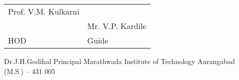 \documentclass[12pt]{article}
\begin{document}
	

		\begin{table}[h]
			\centering
			\begin{tabular}{ |p{6cm}|p{6cm}| }
				\hline
				 \centering
				  Prof. V.M. Kulkarni \\  &    Mr. V.P. Kardile \\
				   \centering
				    HOD  &   Guide \\ \hline
			\end{tabular}					
		\end{table}
		

		 	
		 				
		  \centering
			  Dr.J.H.Godihal
		  Principal
		  Marathwada Institute of Technology 
		  Aurangabad (M.S.) – 431 005

	
	  
	
	
	
	
	
	
	
	
	
	
	
	
	
	
	
	
	
	
	
	
	
	
	
	
	
	
	
	
	
\end{document}
